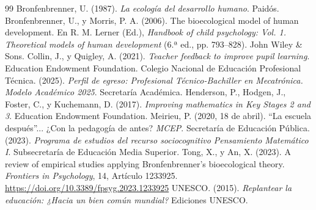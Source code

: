 \documentclass[spanish,letterpaper,oneside]{article}
\begin{document}
\clearpage
\begin{thebibliography}{99}
 Bronfenbrenner, U. (1987). \textit{La ecología del desarrollo humano}. Paidós.
 Bronfenbrenner, U., y Morris, P. A. (2006). The bioecological model of human development. En R. M. Lerner (Ed.), \textit{Handbook of child psychology: Vol. 1. Theoretical models of human development} (6.ª ed., pp. 793--828). John Wiley \& Sons.
 Collin, J., y Quigley, A. (2021). \textit{Teacher feedback to improve pupil learning}. Education Endowment Foundation.
 Colegio Nacional de Educación Profesional Técnica. (2025). \textit{Perfil de egreso: Profesional Técnico-Bachiller en Mecatrónica. Modelo Académico 2025}. Secretaría Académica.
 Henderson, P., Hodgen, J., Foster, C., y Kuchemann, D. (2017). \textit{Improving mathematics in Key Stages 2 and 3}. Education Endowment Foundation.
 Meirieu, P. (2020, 18 de abril). ``La escuela después''... ¿Con la pedagogía de antes? \textit{MCEP}.
 Secretaría de Educación Pública. (2023). \textit{Programa de estudios del recurso sociocognitivo Pensamiento Matemático I}. Subsecretaría de Educación Media Superior.
 Tong, X., y An, X. (2023). A review of empirical studies applying Bronfenbrenner's bioecological theory. \textit{Frontiers in Psychology}, 14, Artículo 1233925. \url{https://doi.org/10.3389/fpsyg.2023.1233925}
 UNESCO. (2015). \textit{Replantear la educación: ¿Hacia un bien común mundial?} Ediciones UNESCO.
\end{thebibliography}
\end{document}
